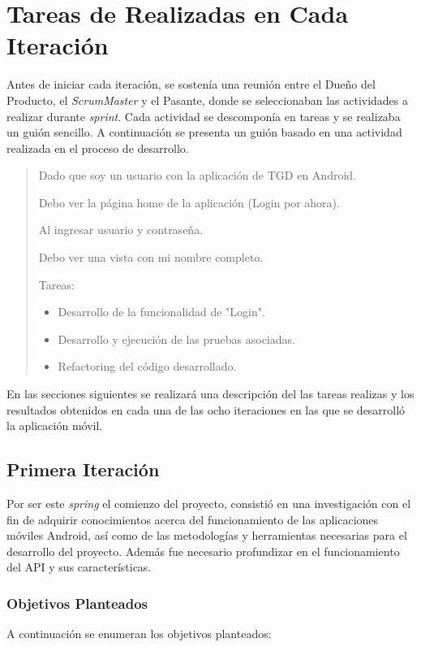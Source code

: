 \section{Tareas de Realizadas en Cada Iteración}

Antes de iniciar cada iteración, se sostenía una reunión entre el Dueño del Producto, el \textit{ScrumMaster} y el Pasante, donde se seleccionaban las actividades a realizar durante \textit{sprint}. Cada actividad se descomponía en tareas y se realizaba un guión sencillo. A continuación se presenta un guión basado en una actividad realizada en el proceso de desarrollo.

\begin{quotation}

Dado que soy un usuario con la aplicación de TGD en Android.
 
Debo ver la página home de la aplicación (Login por ahora).

Al ingresar usuario y contraseña. 

Debo ver una vista con mi nombre completo. 

Tareas: 
\begin{itemize}
\item Desarrollo de la funcionalidad de "Login".
\item Desarrollo y ejecución de las pruebas asociadas.
\item Refactoring del código desarrollado.
\end{itemize}
\end{quotation}

En las secciones siguientes se realizará una descripción del las tareas realizas y los resultados obtenidos en cada una de las ocho iteraciones en las que se desarrolló la aplicación móvil.

\subsection{Primera Iteración}

Por ser este \textit{spring} el comienzo del proyecto, consistió en una investigación con el fin de adquirir conocimientos acerca del funcionamiento de las aplicaciones móviles Android, así como de las metodologías y herramientas necesarias para el desarrollo del proyecto. Además fue necesario profundizar en el funcionamiento del API y sus características.

\subsubsection{Objetivos Planteados}
A continuación se enumeran los objetivos planteados:

